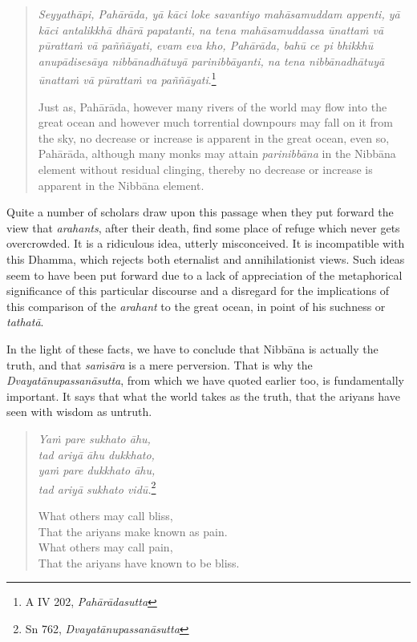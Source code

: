 \begin{quote}
\emph{Seyyathāpi, Pahārāda, yā kāci loke savantiyo mahāsamuddam appenti, yā kāci antalikkhā dhārā papatanti, na tena mahāsamuddassa ūnattaṁ vā pūrattaṁ vā paññāyati, evam eva kho, Pahārāda, bahū ce pi bhikkhū anupādisesāya nibbānadhātuyā parinibbāyanti, na tena nibbānadhātuyā ūnattaṁ vā pūrattaṁ va paññāyati}.\footnote{A IV 202, \emph{Pahārādasutta}}

Just as, Pahārāda, however many rivers of the world may flow into the great ocean and however much torrential downpours may fall on it from the sky, no decrease or increase is apparent in the great ocean, even so, Pahārāda, although many monks may attain \emph{parinibbāna} in the Nibbāna element without residual clinging, thereby no decrease or increase is apparent in the Nibbāna element.
\end{quote}

Quite a number of scholars draw upon this passage when they put forward the view that \emph{arahants}, after their death, find some place of refuge which never gets overcrowded. It is a ridiculous idea, utterly misconceived. It is incompatible with this Dhamma, which rejects both eternalist and annihilationist views. Such ideas seem to have been put forward due to a lack of appreciation of the metaphorical significance of this particular discourse and a disregard for the implications of this comparison of the \emph{arahant} to the great ocean, in point of his suchness or \emph{tathatā}.

In the light of these facts, we have to conclude that Nibbāna is actually the truth, and that \emph{saṁsāra} is a mere perversion. That is why the \emph{Dvayatānupassanāsutta}, from which we have quoted earlier too, is fundamentally important. It says that what the world takes as the truth, that the ariyans have seen with wisdom as untruth.

\begin{quote}
\emph{Yaṁ pare sukhato āhu,}\\
\emph{tad ariyā āhu dukkhato,}\\
\emph{yaṁ pare dukkhato āhu,}\\
\emph{tad ariyā sukhato vidū.}\footnote{Sn 762, \emph{Dvayatānupassanāsutta}}

What others may call bliss,\\
That the ariyans make known as pain.\\
What others may call pain,\\
That the ariyans have known to be bliss.
\end{quote}

